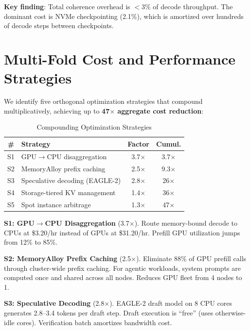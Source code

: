 \documentclass[conference,10pt]{IEEEtran}
\begin{document}
\textbf{Key finding}: Total coherence overhead is $<$3\% of decode throughput. The dominant cost is NVMe checkpointing (2.1\%), which is amortized over hundreds of decode steps between checkpoints.

\section{Multi-Fold Cost and Performance Strategies}
\label{sec:multifold}

We identify five orthogonal optimization strategies that compound multiplicatively, achieving up to \textbf{47$\times$ aggregate cost reduction}:

\begin{table}[!htbp]
\caption{Compounding Optimization Strategies}
\label{tab:compound}
\centering\footnotesize
\begin{tabular}{@{}clcc@{}}
\toprule
\textbf{\#} & \textbf{Strategy} & \textbf{Factor} & \textbf{Cumul.} \\
\midrule
S1 & GPU$\to$CPU disaggregation & 3.7$\times$ & 3.7$\times$ \\
S2 & MemoryAlloy prefix caching & 2.5$\times$ & 9.3$\times$ \\
S3 & Speculative decoding (EAGLE-2) & 2.8$\times$ & 26$\times$ \\
S4 & Storage-tiered KV management & 1.4$\times$ & 36$\times$ \\
S5 & Spot instance arbitrage & 1.3$\times$ & 47$\times$ \\
\bottomrule
\end{tabular}
\end{table}

\textbf{S1: GPU$\to$CPU Disaggregation} (3.7$\times$). Route memory-bound decode to CPUs at \$3.20/hr instead of GPUs at \$31.20/hr. Prefill GPU utilization jumps from 12\% to 85\%.

\textbf{S2: MemoryAlloy Prefix Caching} (2.5$\times$). Eliminate 88\% of GPU prefill calls through cluster-wide prefix caching. For agentic workloads, system prompts are computed once and shared across all nodes. Reduces GPU fleet from 4 nodes to 1.

\textbf{S3: Speculative Decoding} (2.8$\times$). EAGLE-2 draft model on 8 CPU cores generates 2.8--3.4 tokens per draft step. Draft execution is ``free'' (uses otherwise-idle cores). Verification batch amortizes bandwidth cost.
\end{document}
